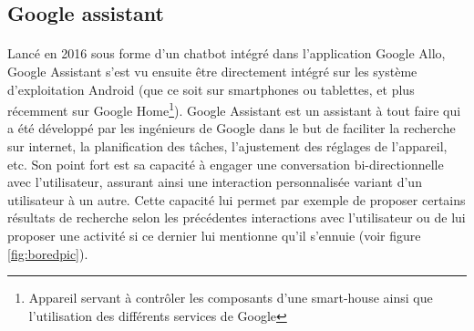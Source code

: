\subsection{Google assistant}\label{googleass}
\paragraph{}
Lancé en 2016 sous forme d'un chatbot intégré dans l'application Google Allo,  Google Assistant s'est vu ensuite être directement intégré sur les système d'exploitation Android (que ce soit sur smartphones ou tablettes, et plus récemment sur Google Home\footnote{Appareil servant à contrôler les composants d'une smart-house ainsi que l'utilisation des différents services de Google}). Google Assistant est un assistant à tout faire qui a été développé par les ingénieurs de Google dans le but de faciliter la recherche sur internet, la planification des tâches, l'ajustement des réglages de l'appareil, etc. Son point fort est sa capacité à engager une conversation bi-directionnelle avec l'utilisateur, assurant ainsi une interaction personnalisée variant d'un utilisateur à un autre. Cette capacité lui permet par exemple de proposer certains résultats de recherche selon les précédentes interactions avec l'utilisateur ou de lui proposer une activité si ce dernier lui mentionne qu'il s'ennuie (voir figure \ref{fig:boredpic}).




